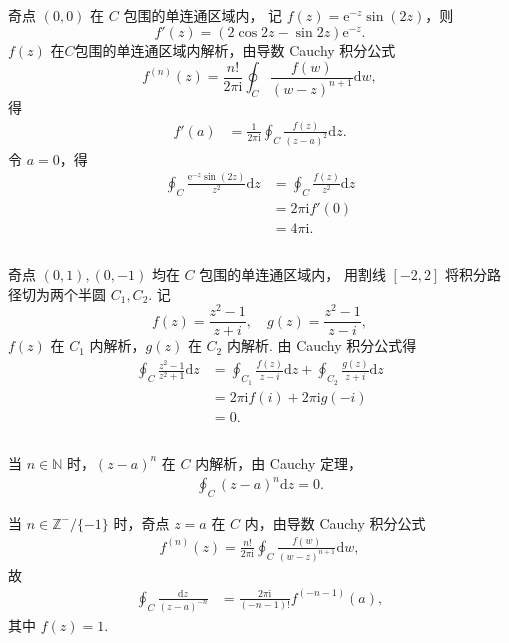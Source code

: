 \documentclass[12pt]{article}
\begin{document}
\subsection{}
奇点 $(0,0)$ 在 $C$ 包围的单连通区域内，
记 $f(z) = \mathrm{e}^{-z}\sin(2z)$，则
\[
f'(z) = \left(2\cos 2z - \sin 2z\right)\mathrm{e}^{-z}.
\]
$f(z)$ 在$C$包围的单连通区域内解析，由导数 Cauchy 积分公式
\[
f^{(n)}(z) = \frac{n!}{2\pi\mathrm{i}} \oint_C \frac{f(w)}{(w-z)^{n+1}} \mathrm{d}w,
\]
得
\begin{align*}
f'(a) &= \frac{1}{2\pi\mathrm{i}} \oint_C \frac{f(z)}{(z-a)^2} \mathrm{d}z.
\end{align*}
令 $a=0$，得
\begin{align*}
\oint_C \frac{\mathrm{e}^{-z}\sin(2z)}{z^2} \mathrm{d}z &= \oint_C \frac{f(z)}{z^2} \mathrm{d}z \\
&= 2\pi\mathrm{i} f'(0) \\
&= 4\pi\mathrm{i}.
\end{align*}
\subsection{}
奇点 $(0,1),(0,-1)$ 均在 $C$ 包围的单连通区域内，
用割线 $[-2,2]$ 将积分路径切为两个半圆 $C_1,C_2$. 
记
\[
f(z) = \frac{z^2-1}{z+i}, \quad g(z) = \frac{z^2-1}{z-i},
\]
$f(z)$ 在 $C_1$ 内解析，$g(z)$ 在 $C_2$ 内解析. 由 Cauchy 积分公式得
\begin{align*}
\oint_C \frac{z^2-1}{z^2+1} \mathrm{d}z &= \oint_{C_1} \frac{f(z)}{z-i} \mathrm{d}z + \oint_{C_2} \frac{g(z)}{z+i} \mathrm{d}z \\
&= 2\pi\mathrm{i} f(i) + 2\pi\mathrm{i} g(-i) \\
&= 0.
\end{align*}
\subsection{}
当 \( n \in \mathbb{N} \) 时，\( \left( z-a \right)^n \) 在 \( C \) 内解析，由 Cauchy 定理，
\begin{align*}
\oint_C \left( z-a \right)^n \mathrm{d}z = 0.
\end{align*}

当 \( n \in \mathbb{Z}^- /\{-1\}\) 时，奇点 \( z=a \) 在 \( C \) 内，由导数 Cauchy 积分公式
\begin{align*}
f^{(n)}(z) = \frac{n!}{2\pi\mathrm{i}} \oint_C \frac{f(w)}{\left( w-z \right)^{n+1}} \mathrm{d}w,
\end{align*}
故
\begin{align*}
\oint_C \frac{\mathrm{d}z}{\left( z-a \right)^{-n}} &= \frac{2\pi\mathrm{i}}{(-n-1)!} f^{(-n-1)}(a),
\end{align*}
其中 \( f(z) = 1 \).
\end{document}
